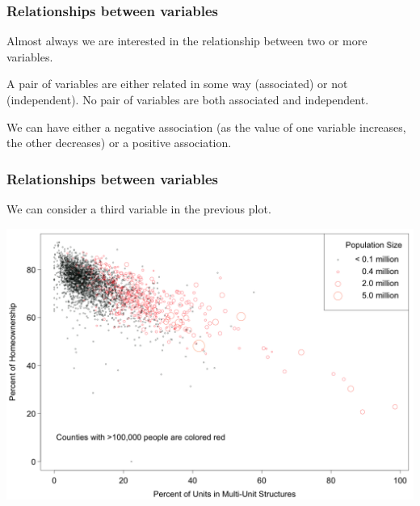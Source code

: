 \documentclass[slides]{beamer}
\newcommand{\blue}[1]{\textcolor{blue2}{#1}}
\begin{document}
\begin{frame}
\frametitle{Relationships between variables}
Almost always we are interested in the relationship between two or more variables.

\vspace{0.25cm}

\pause A pair of variables are either related in some way (\blue{associated}) or not (\blue{independent}).  No pair of variables are both associated and independent.   

\vspace{0.25cm}

\pause We can have either a \blue{negative association} (as the value of one variable increases, the other decreases) or a \blue{positive association}.

\end{frame}


\begin{frame}[fragile]
\frametitle{Relationships between variables}
We can consider a third variable in the previous plot.
\begin{center}
\includegraphics[width=\textwidth]{figure/MHP.png}
\end{center}
\end{frame}
\end{document}
